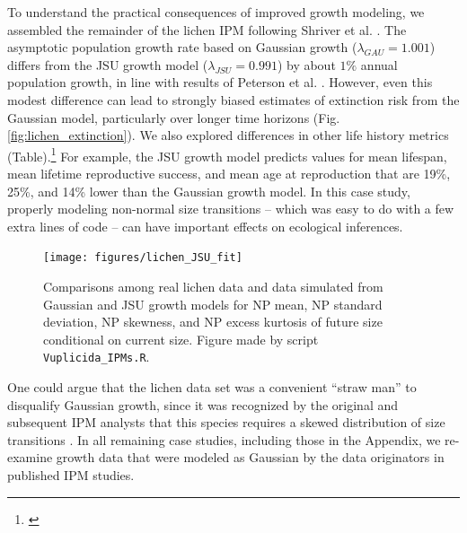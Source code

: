 \documentclass[12pt]{article}
\newcommand{\tom}[2]{{\color{red}{#1}}\footnote{\textit{\color{red}{#2}}}}
\begin{document}
To understand the practical consequences of improved growth modeling, we assembled the remainder of the lichen IPM following Shriver et al. \citeyear{shriver2012comparative}. 
The asymptotic population growth rate based on Gaussian growth ($\lambda_{GAU}=1.001$) differs from the JSU growth model ($\lambda_{JSU}=0.991$) by about $1\%$ annual population growth, in line with results of Peterson et al. \citeyear{peterson2019improving}. 
However, even this modest difference can lead to strongly biased estimates of extinction risk from the Gaussian model, particularly over longer time horizons (Fig. \ref{fig:lichen_extinction}). 
We also explored differences in other life history metrics (Table).\tom{}{What is the best way to cite Chrissy Hernandez' life history functions?} 
For example, the JSU growth model predicts values for mean lifespan, mean lifetime reproductive success, and mean age at reproduction that are 19\%, 25\%, and 14\% lower than the Gaussian growth model. 
In this case study, properly modeling non-normal size transitions -- which was easy to do with a few extra lines of code -- can have important effects on ecological inferences. 
\begin{figure}[tbp]
	\centering
	\texttt{[image: figures/lichen\_JSU\_fit]}
	\caption{Comparisons among real lichen data and data simulated from Gaussian and JSU growth models for NP mean, NP standard deviation, NP skewness, and NP excess kurtosis of future size conditional on current size. Figure made by script \texttt{Vuplicida\_IPMs.R}.}
	\label{fig:lichen_fit}
\end{figure} 

One could argue that the lichen data set was a convenient ``straw man'' to disqualify Gaussian growth, since it was recognized by the original and subsequent IPM analysts that this species requires a skewed distribution of size transitions \citep{shriver2012comparative,peterson2019improving}. 
In all remaining case studies, including those in the Appendix, we re-examine growth data that were modeled as Gaussian by the data originators in published IPM studies. 
\end{document}
